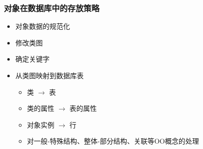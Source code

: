\documentclass[compress]{beamer}
\begin{document}
\begin{frame}
  \frametitle{对象在数据库中的存放策略}
  \begin{itemize}
    \item 对象数据的规范化
    \item 修改类图
    \item 确定关键字
    \item 从类图映射到数据库表
      \begin{itemize}
        \item 类 $\rightarrow$ 表
        \item 类的属性 $\rightarrow$ 表的属性
        \item 对象实例 $\rightarrow$ 行
        \item 对一般-特殊结构、整体-部分结构、关联等OO概念的处理
      \end{itemize}
  \end{itemize}
\end{frame}
\end{document}
